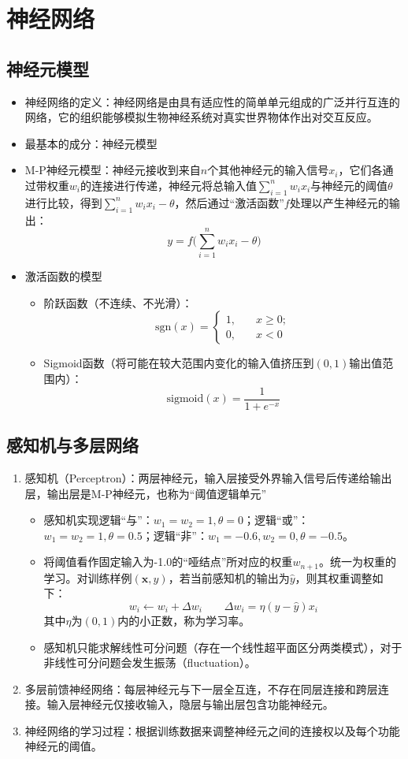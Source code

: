 \documentclass{ctexart}
\begin{document}
			\section{神经网络}
				\subsection{神经元模型}
					\begin{itemize}
						\item 神经网络的定义：神经网络是由具有适应性的简单单元组成的广泛并行互连的网络，它的组织能够模拟生物神经系统对真实世界物体作出对交互反应。
						\item 最基本的成分：神经元模型
						\item M-P神经元模型：神经元接收到来自$n$个其他神经元的输入信号$x_i$，它们各通过带权重$w_i$的连接进行传递，神经元将总输入值$\sum_{i=1}^{n}w_ix_i$与神经元的阈值$\theta$进行比较，得到$\sum_{i=1}^{n}w_ix_i-\theta$，然后通过``激活函数''$f$处理以产生神经元的输出：\[y=f\big(\sum_{i=1}^{n}w_ix_i-\theta\big)\]
						\item 激活函数的模型\begin{itemize}
							\item 阶跃函数（不连续、不光滑）：\[\mathrm{sgn}(x)=\left\{\begin{aligned}
							1, \quad& x\ge0;\\
							0, \quad& x < 0
							\end{aligned}\right.\]
							\item Sigmoid函数（将可能在较大范围内变化的输入值挤压到$(0,1)$输出值范围内）：\[\mathrm{sigmoid}(x)=\frac{1}{1+e^{-x}}\]
						\end{itemize}
					\end{itemize}
				\subsection{感知机与多层网络}
					\begin{enumerate}[1.]
						\item 感知机（Perceptron）：两层神经元，输入层接受外界输入信号后传递给输出层，输出层是M-P神经元，也称为``阈值逻辑单元''\begin{itemize}
							\item 感知机实现逻辑``与''：$w_1=w_2=1,\theta=0$；逻辑``或''：$w_1=w_2=1,\theta=0.5$；逻辑``非''：$w_1=-0.6,w_2=0,\theta=-0.5$。
							\item 将阈值看作固定输入为-1.0的``哑结点''所对应的权重$w_{n+1}$。统一为权重的学习。对训练样例$(\bm{x},y)$，若当前感知机的输出为$\hat{y}$，则其权重调整如下：\[w_i\leftarrow w_i + \Delta w_i\quad\quad\Delta w_i=\eta(y-\hat{y})x_i\]其中$\eta$为$(0,1)$内的小正数，称为学习率。
							\item 感知机只能求解线性可分问题（存在一个线性超平面区分两类模式），对于非线性可分问题会发生振荡（fluctuation）。
						\end{itemize}
						\item 多层前馈神经网络：每层神经元与下一层全互连，不存在同层连接和跨层连接。输入层神经元仅接收输入，隐层与输出层包含功能神经元。
						\item 神经网络的学习过程：根据训练数据来调整神经元之间的连接权以及每个功能神经元的阈值。
					\end{enumerate}
\end{document}
